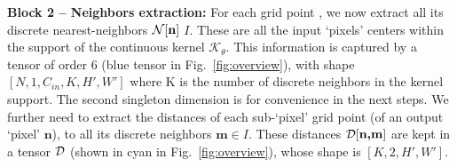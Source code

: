 \textbf{Block 2 -- Neighbors extraction:} For each grid point , we now extract all its discrete nearest-neighbors $\textcolor{black}{\mathcal{N}[\textbf{n}]}$  $I$. These are all the input `pixels' centers within the support of the continuous kernel $\mathcal{K}_\theta$. This information is captured by a tensor of order 6 (blue tensor in Fig.~\ref{fig:overview}),  with shape $[N,1,C_{in},K,H',W']$ where K is the number of discrete neighbors in the kernel support. The second singleton dimension is for convenience in the next steps. We further need to extract the distances of each sub-`pixel' grid point  (of an output `pixel' {$\textbf{n}$}),  to all its discrete neighbors  ${\textbf{m}}\in I$. These distances $\textcolor{black}{\mathcal{D}[\textbf{n,m}]}$ are kept in a tensor $\textcolor{black}{\mathcal{D}}$ (shown in cyan in Fig.~\ref{fig:overview}), whose shape is $[K,2,H',W']$.


